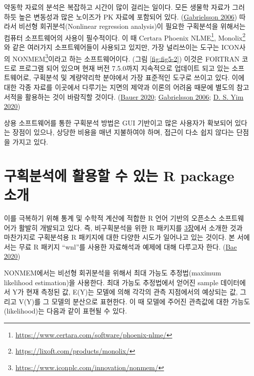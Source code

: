 \documentclass[
  11pt,
  krantz2, a4paper, twoside]{krantz}
\theoremstyle{definition}
\theoremstyle{definition}
\theoremstyle{definition}
\theoremstyle{definition}
\theoremstyle{remark}
\begin{document}
약동학 자료의 분석은 복잡하고 시간이 많이 걸리는 일이다. 모든 생물학 자료가 그러하듯 높은 변동성과 많은 노이즈가 PK 자료에 포함되어 있다. (\protect\hyperlink{ref-gabrielsson}{Gabrielsson 2006})
따라서 비선형 회귀분석(Nonlinear regression analysis)이 필요한 구획분석을 위해서는 컴퓨터 소프트웨어의 사용이 필수적이다.
이 때 Certara Phoenix NLME\footnote{\url{https://www.certara.com/software/phoenix-nlme/}}, Monolix\footnote{\url{https://lixoft.com/products/monolix/}}와 같은 여러가지 소프트웨어들이 사용되고 있지만, 가장 널리쓰이는 도구는 ICON사의 NONMEM\footnote{\url{https://www.iconplc.com/innovation/nonmem/}}이라고 하는 소프트웨어이다. (그림 \ref{fig:fig5-2})
이것은 FORTRAN 코드로 프로그램 되어 있으며 현재 버전 7.5.0까지 지속적으로 업데이트 되고 있는 소프트웨어로, 구획분석 및 계량약리학 분야에서 가장 표준적인 도구로 쓰이고 있다. 
이에 대한 각종 자료를 이곳에서 다루기는 지면의 제약과 이론의 어려움 때문에 별도의 참고서적을 활용하는 것이 바람직할 것이다. (\protect\hyperlink{ref-nonmem}{Bauer 2020}; \protect\hyperlink{ref-gabrielsson}{Gabrielsson 2006}; \protect\hyperlink{ref-basic}{D. S. Yim 2020})

상용 소프트웨어를 통한 구획분석 방법은 GUI 기반이고 많은 사용자가 확보되어 있다는 장점이 있으나, 상당한 비용을 매년 지불하여야 하며, 접근이 다소 쉽지 않다는 단점을 가지고 있다.

\hypertarget{uxad6cuxd68duxbd84uxc11duxc5d0-uxd65cuxc6a9uxd560-uxc218-uxc788uxb294-r-package-uxc18cuxac1c}{%
\section{구획분석에 활용할 수 있는 R package 소개}\label{uxad6cuxd68duxbd84uxc11duxc5d0-uxd65cuxc6a9uxd560-uxc218-uxc788uxb294-r-package-uxc18cuxac1c}}

이를 극복하기 위해 통계 및 수학적 계산에 적합한 R 언어 기반의 오픈소스 소프트웨어가 활발히 개발되고 있다.
즉, 비구획분석을 위한 R 패키지를 \protect\hyperlink{nca-analysis}{3장}에서 소개한 것과 마찬가지로 구획분석용 R 패키지에 대한 다양한 시도가 일어나고 있는 것이다.
본 서에서는 무료 R 패키지 ``wnl''를 사용한 자료해석과 예제에 대해 다루고자 한다. (\protect\hyperlink{ref-R-wnl}{Bae 2020})

NONMEM에서는 비선형 회귀분석을 위해서 최대 가능도 추정법(maximum likelihood estimation)을 사용한다. 
최대 가능도 추정법에서 얻어진 sample 데이터에서 Y가 현재 측정된 값, E(Y)는 모델에 의해 각각의 관측 지점에서의 예상되는 값, 그리고 V(Y)를 그 모델의 분산으로 표현한다. 
이 때 모델에 주어진 관측값에 대한 가능도(likelihood)는 다음과 같이 표현될 수 있다.
\end{document}
